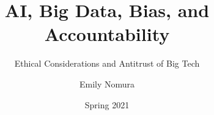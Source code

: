 \documentclass[twoside]{article}
\title{AI, Big Data, Bias, and Accountability}
\subtitle{Ethical Considerations and Antitrust of Big Tech} %
\author{Emily Nomura}
\date{Spring 2021}
\begin{document}
\maketitle{}



\cite{ai}
\cite{amazon1}
\cite{amazon2}
\cite{antitrust}
\cite{aws}
\cite{crashcourse1}
\cite{crashcourse2}
\cite{facebook}
\cite{ftc}
\cite{genetic}
\cite{monopoly}
\cite{napkin}

\printbibliography
\end{document}
